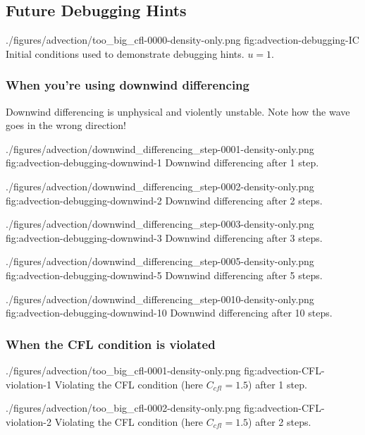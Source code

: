 \subsection{Future Debugging Hints}




\quickfigcap
	{./figures/advection/too_big_cfl-0000-density-only.png}
	{fig:advection-debugging-IC}
	{Initial conditions used to demonstrate debugging hints. $u = 1$.}


\subsubsection{When you're using downwind differencing}

Downwind differencing is unphysical and violently unstable.
Note how the wave goes in the wrong direction!


\quickfigcap
	{./figures/advection/downwind_differencing_step-0001-density-only.png}
	{fig:advection-debugging-downwind-1}
	{Downwind differencing after 1 step.}

\quickfigcap
	{./figures/advection/downwind_differencing_step-0002-density-only.png}
	{fig:advection-debugging-downwind-2}
	{Downwind differencing after 2 steps.}

\quickfigcap
	{./figures/advection/downwind_differencing_step-0003-density-only.png}
	{fig:advection-debugging-downwind-3}
	{Downwind differencing after 3 steps.}

\quickfigcap
	{./figures/advection/downwind_differencing_step-0005-density-only.png}
	{fig:advection-debugging-downwind-5}
	{Downwind differencing after 5 steps.}

\quickfigcap
	{./figures/advection/downwind_differencing_step-0010-density-only.png}
	{fig:advection-debugging-downwind-10}
	{Downwind differencing after 10 steps.}








\subsubsection{When the CFL condition is violated}


\quickfigcap
	{./figures/advection/too_big_cfl-0001-density-only.png}
	{fig:advection-CFL-violation-1}
	{Violating the CFL condition (here $C_{cfl} = 1.5$) after 1 step.}

\quickfigcap
	{./figures/advection/too_big_cfl-0002-density-only.png}
	{fig:advection-CFL-violation-2}
	{Violating the CFL condition (here $C_{cfl} = 1.5$) after 2 steps.}

